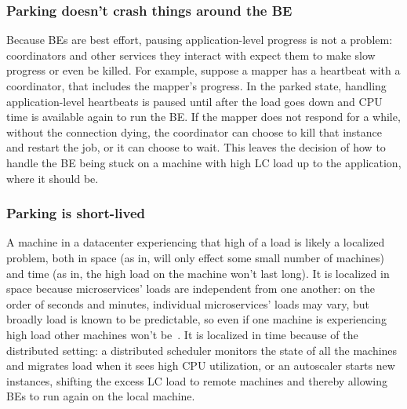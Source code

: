 \subsubsection{Parking doesn't crash things around the BE}
Because BEs are best effort, pausing application-level progress is not a
problem: coordinators and other services they interact with expect them to make
slow progress or even be killed. For example, suppose a mapper has a heartbeat
with a coordinator, that includes the mapper's progress. In the parked state,
handling application-level heartbeats is paused until after the load goes down
and CPU time is available again to run the BE. If the mapper does not respond
for a while, without the connection dying, the coordinator can choose to kill
that instance and restart the job, or it can choose to wait. This leaves the
decision of how to handle the BE being stuck on a machine with high LC load up
to the application, where it should be.

\subsubsection{Parking is short-lived}
A machine in a datacenter experiencing that high of a load is likely a localized
problem, both in space (as in, will only effect some small number of machines)
and time (as in, the high load on the machine won't last long). It is localized
in space because microservices' loads are independent from one another: on the
order of seconds and minutes, individual microservices' loads may vary, but
broadly load is known to be predictable, so even if one machine is experiencing
high load other machines won't be~\cite{TODO}. It is localized in time because
of the distributed setting: a distributed scheduler monitors the state of all
the machines and migrates load when it sees high CPU utilization, or an
autoscaler starts new instances, shifting the excess LC load to remote machines
and thereby allowing BEs to run again on the local machine.